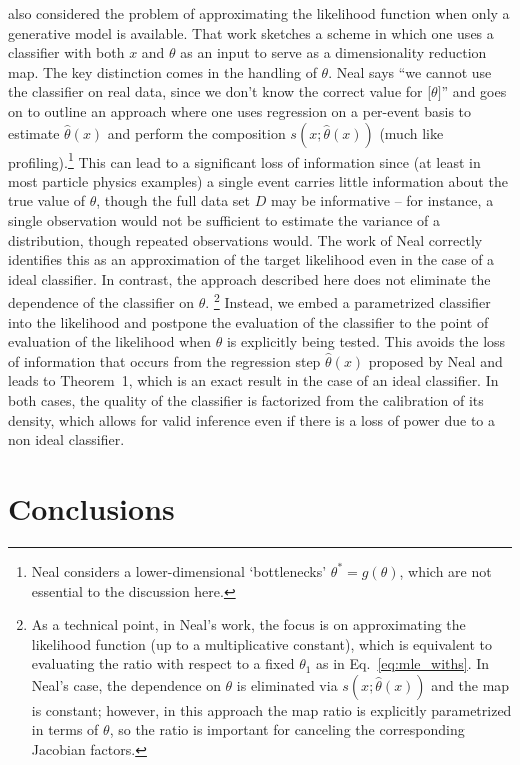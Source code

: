 \documentclass[aoas,preprint]{imsart}
\numberwithin{equation}{section}
\theoremstyle{plain}
\begin{document}
\cite{Neal:2007zz} also considered the problem of approximating the likelihood function when only a generative model is available. That work sketches a scheme in which one uses a classifier with both $x$ and $\theta$ as an input to serve as a dimensionality reduction map. 
The key distinction comes in the handling of $\theta$.  Neal says  ``we cannot use the classifier on real data, since we don't know the correct value for [$\theta]$'' and goes on to outline an approach where one uses regression on a per-event basis to estimate $\hat{\theta}(x)$ and perform the composition $s(x; \hat{\theta}(x))$ (much like profiling).\footnote{Neal considers a lower-dimensional `bottlenecks' $\theta^*=g(\theta)$, which are not essential to the discussion here.}  This can lead to a significant loss of information since (at least in most particle physics examples) a single event carries little information about the true value of $\theta$, though the full data set $D$ may be informative -- for instance, a single observation would not be sufficient to estimate the variance of a distribution, though repeated observations would.  The work of Neal correctly identifies this as an approximation of the target likelihood even in the case of a ideal classifier. In contrast, the approach described here does not eliminate the dependence of the classifier on $\theta$.%
\footnote{As a technical point, in Neal's work, the focus is on approximating the likelihood function (up to a multiplicative constant), which is equivalent to evaluating the ratio  with respect to a fixed $\theta_1$ as in Eq.~\ref{eq:mle_withs}. In Neal's case, the dependence on $\theta$ is eliminated via $s(x; \hat{\theta}(x))$ and the map is constant; however, in this approach the map ratio is explicitly parametrized in terms of $\theta$, so the ratio is important for canceling the corresponding Jacobian factors.} Instead, we embed a parametrized classifier into the likelihood and postpone the evaluation of the classifier to the point of evaluation of the likelihood when $\theta$ is explicitly being tested. This avoids the loss of information that occurs from the regression step $\hat{\theta}(x)$ proposed by Neal and leads to Theorem~1, which is an exact result in the case of an ideal classifier. In both cases, the quality of the classifier is factorized from the calibration of its density, which allows for valid inference even if there is a loss of power due to a non ideal classifier.



\section{Conclusions}
\end{document}
